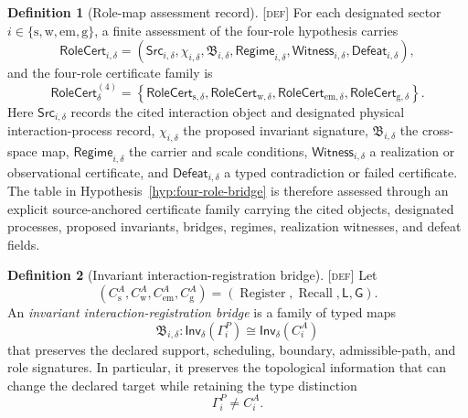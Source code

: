 \documentclass[11pt]{article}
\newcommand{\Inv}{\ensuremath{\mathsf{Inv}}}
\newcommand{\Register}{\ensuremath{\operatorname{Register}}}
\newcommand{\Recall}{\ensuremath{\operatorname{Recall}}}
\newcommand{\GOp}{\ensuremath{\mathsf{G}}}
\newcommand{\LOp}{\ensuremath{\mathsf{L}}}
\newcommand{\Bridge}{\ensuremath{\mathfrak{B}}}
\newcommand{\Defn}{\textsc{[def]}}
\theoremstyle{definition}
\newtheorem{sdefinition}{Definition}
\begin{document}
\begin{sdefinition}[Role-map assessment record]
\label{def:role-map-assessment-record}
\Defn{} For each designated sector $i\in\{\mathrm s,\mathrm w,\mathrm{em},\mathrm g\}$,
a finite assessment of the four-role hypothesis carries
\begin{equation}
\mathsf{RoleCert}_{i,\delta}=
\left(
\mathsf{Src}_{i,\delta},\chi_{i,\delta},\Bridge_{i,\delta},
\mathsf{Regime}_{i,\delta},\mathsf{Witness}_{i,\delta},
\mathsf{Defeat}_{i,\delta}
\right),
\label{eq:role-map-assessment-record}
\end{equation}
and the four-role certificate family is
\begin{equation}
\mathsf{RoleCert}^{(4)}_\delta=
\left\{
\mathsf{RoleCert}_{\mathrm s,\delta},
\mathsf{RoleCert}_{\mathrm w,\delta},
\mathsf{RoleCert}_{\mathrm{em},\delta},
\mathsf{RoleCert}_{\mathrm g,\delta}
\right\}.
\label{eq:four-role-certificate-family}
\end{equation}
Here $\mathsf{Src}_{i,\delta}$ records the cited interaction object and designated
physical interaction-process record, $\chi_{i,\delta}$ the proposed invariant
signature, $\Bridge_{i,\delta}$ the cross-space map,
$\mathsf{Regime}_{i,\delta}$ the carrier and scale conditions,
$\mathsf{Witness}_{i,\delta}$ a realization or observational certificate, and
$\mathsf{Defeat}_{i,\delta}$ a typed contradiction or failed certificate. The table
in Hypothesis~\ref{hyp:four-role-bridge} is therefore assessed through an explicit
source-anchored certificate family carrying the cited objects, designated processes,
proposed invariants, bridges, regimes, realization witnesses, and defeat fields.
\end{sdefinition}

\begin{sdefinition}[Invariant interaction-registration bridge]
\label{def:invariant-interaction-registration-bridge}
\Defn{} Let
\begin{equation}
(C_{\mathrm{s}}^A,C_{\mathrm{w}}^A,C_{\mathrm{em}}^A,C_{\mathrm{g}}^A)
=(\Register,\Recall,\LOp,\GOp).
\label{eq:registration-role-basis}
\end{equation}
An \emph{invariant interaction-registration bridge} is a family of typed maps
\begin{equation}
\Bridge_{i,\delta}:
\Inv_\delta(\Gamma_i^P)\cong\Inv_\delta(C_i^A)
\label{eq:invariant-interaction-registration-bridge}
\end{equation}
that preserves the declared support, scheduling, boundary, admissible-path, and
role signatures. In particular, it preserves the topological information that can
change the declared target while retaining the type distinction
\begin{equation}
\Gamma_i^P\neq C_i^A.
\label{eq:nonidentity-force-registration}
\end{equation}
\end{sdefinition}
\end{document}
